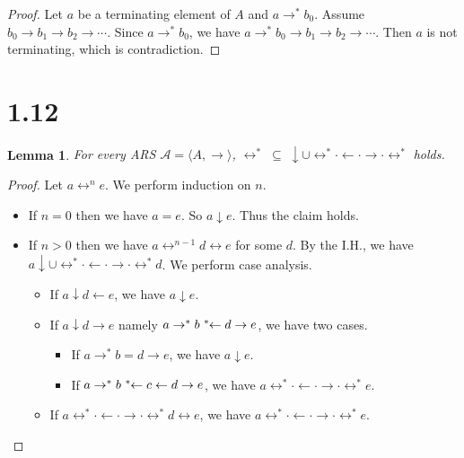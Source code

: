\documentclass[autodetect-enginem]{article}
\theoremstyle{plain}
\newtheorem*{lemma*}{Lemma}
\theoremstyle{definition}
\newcommand{\lto}{\reflectbox{$\rightarrow^*$}}
\begin{document}
\begin{proof}
    Let $a$ be a terminating element of $A$ and $a \to^* b_0$.
    Assume $b_0 \to b_1 \to b_2 \to \cdots$.
    Since $a \to^* b_0$, we have $a \to^* b_0 \to b_1 \to b_2 \to \cdots$.
    Then $a$ is not terminating, which is contradiction.
\end{proof}

\section*{1.12}

\newcommand{\conv}{\leftrightarrow}
\newcommand{\join}{\downarrow}
\newcommand{\ito}{\leftarrow}
\begin{lemma*}
    For every ARS $\mathcal{A} = \langle A, \to \rangle$,
    $\conv^* \; \subseteq \; \downarrow \cup \conv^* \cdot \leftarrow \cdot \rightarrow \cdot \conv^*$ holds.
\end{lemma*}

\begin{proof}
    Let $a \conv^n e$.
    We perform induction on $n$.
    \begin{itemize}
        \item If $n = 0$ then we have $a = e$. So $a \downarrow e$.
            Thus the claim holds. %
        \item If $n > 0$ then we have $a \conv^{n-1} d \conv e$ for some $d$.
            By the I.H., we have $a \downarrow \cup \conv^* \cdot \leftarrow \cdot \rightarrow \cdot \conv^* d$.
            We perform case analysis.
            \begin{itemize}
                \item If $a \join d \ito e$, we have $a \join e$.
                \item If $a \join d \to e$ namely $a \to^* b \; \lto \; d \to e$, we have two cases.
                    \begin{itemize}
                        \item If $a \to^* b = d \to e$, we have $a \join e$.
                        \item If $a \to^* b \; \lto \; c \ito d \to e$,
                            we have $a \conv^* \cdot \ito \cdot \to \cdot \conv^* e$.
                    \end{itemize}
                \item If $a \conv^* \cdot \ito \cdot \to \cdot \conv^* d \conv e$, we have
                    $a \conv^* \cdot \ito \cdot \to \cdot \conv^* e$.
            \end{itemize}
    \end{itemize}
\end{proof}
\end{document}
